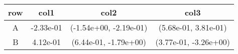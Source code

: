 \begin{tabular}{cccc}
\toprule
row&col1&col2&col3\tabularnewline
\midrule
A&-2.33e-01& (-1.54e+00, -2.19e-01)& (5.68e-01, 3.81e-01)\tabularnewline
B&4.12e-01& (6.44e-01, -1.79e+00)& (3.77e-01, -3.26e+00)\tabularnewline
\bottomrule
\end{tabular}
